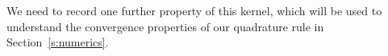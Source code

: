 %

We need to record one further property of this kernel, which will be
used to understand the convergence properties of our quadrature rule in
Section~\ref{s:numerics}.

